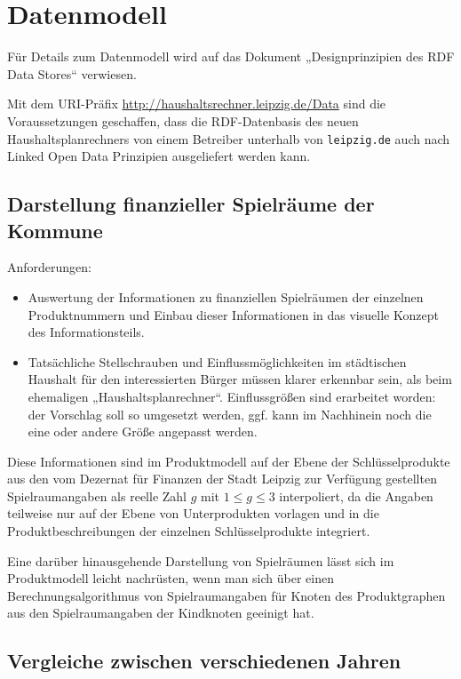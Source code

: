 \documentclass[11pt,a4paper,twoside]{article}
\begin{document}
\section{Datenmodell}

Für Details zum Datenmodell wird auf das Dokument „Designprinzipien des RDF
Data Stores“ verwiesen.

Mit dem URI-Präfix \url{http://haushaltsrechner.leipzig.de/Data} sind die
Voraussetzungen geschaffen, dass die RDF-Datenbasis des neuen
Haushaltsplanrechners von einem Betreiber unterhalb von \texttt{leipzig.de}
auch nach Linked Open Data Prinzipien ausgeliefert werden kann.

\subsection{Darstellung finanzieller Spielräume der Kommune}

Anforderungen:
\begin{itemize}\itemsep0pt
\item Auswertung der Informationen zu finanziellen Spielräumen der einzelnen
  Produktnummern und Einbau dieser Informationen in das visuelle Konzept des
  Informationsteils. 
\item Tatsächliche Stellschrauben und Einflussmöglichkeiten im städtischen
  Haushalt für den interessierten Bürger müssen klarer erkennbar sein, als
  beim ehemaligen „Haushaltsplanrechner“. Einflussgrößen sind erarbeitet
  worden: der Vorschlag soll so umgesetzt werden, ggf. kann im Nachhinein noch
  die eine oder andere Größe angepasst werden.
\end{itemize}

Diese Informationen sind im Produktmodell auf der Ebene der Schlüsselprodukte
aus den vom Dezernat für Finanzen der Stadt Leipzig zur Verfügung gestellten
Spielraumangaben als reelle Zahl $g$ mit $1\le g\le 3$ interpoliert, da die
Angaben teilweise nur auf der Ebene von Unterprodukten vorlagen und in die
Produktbeschreibungen der einzelnen Schlüsselprodukte integriert.

Eine darüber hinausgehende Darstellung von Spielräumen lässt sich im
Produktmodell leicht nachrüsten, wenn man sich über einen
Berechnungsalgorithmus von Spielraumangaben für Knoten des Produktgraphen aus
den Spielraumangaben der Kindknoten geeinigt hat. 

\subsection{Vergleiche zwischen verschiedenen Jahren} 
\end{document}
